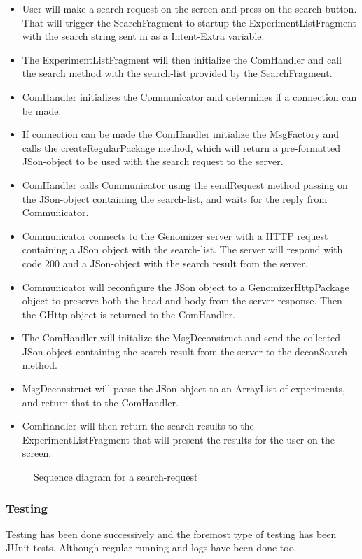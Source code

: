 	\begin{itemize}
		\item
			User will make a search request on the screen and press on the search button. That will trigger the SearchFragment to startup the ExperimentListFragment with the search string sent in as a Intent-Extra variable.
		\item
			The ExperimentListFragment will then initialize the ComHandler and call the search method with the search-list provided by the SearchFragment.
		\item
			ComHandler initializes the Communicator and determines if a connection can be made.
		\item
			If connection can be made the ComHandler initialize the MsgFactory and calls the createRegularPackage method, which will return a pre-formatted JSon-object to be used with the search request to the server.
		\item
			ComHandler calls Communicator using the sendRequest method passing on the JSon-object containing the search-list, and waits for the reply from Communicator.
		\item
			Communicator connects to the Genomizer server with a HTTP request containing a JSon object with the search-list. The server will respond with code 200 and a JSon-object with the search result from the server.
		\item
			Communicator will reconfigure the JSon object to a GenomizerHttpPackage object to preserve both the head and body from the server response. Then the GHttp-object is returned to the ComHandler.
		\item
			The ComHandler will initalize the MsgDeconstruct and send the collected JSon-object containing the search result from the server to the deconSearch method.
		\item
			MsgDeconstruct will parse the JSon-object to an ArrayList of experiments, and return that to the ComHandler.
		\item
			ComHandler will then return the search-results to the ExperimentListFragment that will present the results for the user on the screen.
	\end{itemize} 

	\begin{figure}
		\caption{Sequence diagram for a search-request}
		\label{fig:and_searchseq}
	\end{figure}
\subsubsection{Testing}
Testing has been done successively and the foremost type of testing has been JUnit tests. Although regular running and logs have been done too.

